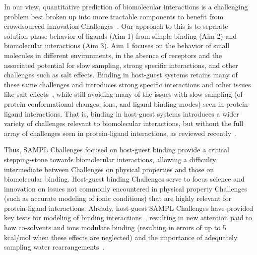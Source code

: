 \documentclass[11pt]{article}
\begin{document}
In our view, quantitative prediction of biomolecular interactions is a challenging problem best broken up into more tractable components to benefit from crowdsourced innovation Challenges~\cite{Saez-Rodriguez:2016:NatRevGenet}.
Our approach to this is to separate solution-phase behavior of ligands (Aim 1) from simple binding (Aim 2) and biomolecular interactions (Aim 3). 
Aim 1 focuses on the behavior of small molecules in different environments, in the absence of receptors and the associated potential for slow sampling, strong specific interactions, and other challenges such as salt effects.
Binding in host-guest systems retains many of these same challenges and introduces strong specific interactions and other issues like salt effects~\cite{Mobley:2017:AnnualReviewofBiophysics}, while still avoiding many of the issues with slow sampling (of protein conformational changes, ions, and ligand binding modes) seen in protein-ligand interactions.
That is, binding in host-guest systems introduces a wider variety of challenges relevant to biomolecular interactions, but without the full array of challenges seen in protein-ligand interactions, as reviewed recently~\cite{Mobley:2017:AnnualReviewofBiophysics}.

Thus, SAMPL Challenges focused on host-guest binding provide a critical stepping-stone towards biomolecular interactions, allowing a difficulty intermediate between Challenges on physical properties and those on biomolecular binding.
Host-guest binding Challenges serve to focus science and innovation on issues not commonly encountered in physical property Challenges (such as accurate modeling of ionic conditions) that are highly relevant for protein-ligand interactions.
Already, host-guest SAMPL Challenges have provided key tests for modeling of binding interactions~\cite{Mobley:2017:AnnualReviewofBiophysics}, resulting in new attention paid to how co-solvents and ions modulate binding (resulting in errors of up to 5 kcal/mol when these effects are neglected) and the importance of adequately sampling water rearrangements~\cite{muddana_sampl4_2014, Mobley:2017:AnnualReviewofBiophysics, yin_overview_2016, bhakat_resolving_2016}. 
\end{document}
